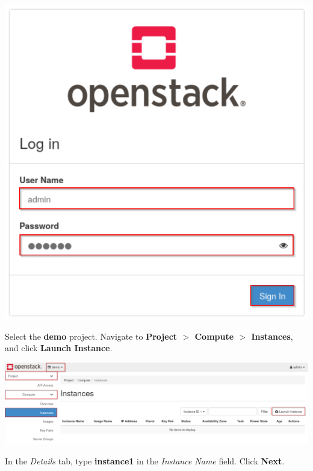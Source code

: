 \documentclass[letterpaper, 12pt]{article}
\begin{document}
\begin{enumerate}
\begin{labstep}
        \begin{center}
            \includegraphics[scale=0.5]{images/part2/step9.png}
        \end{center}
    \end{labstep}

    \begin{labstep}
        Select the \textbf{demo} project.
        Navigate to \textbf{Project $>$ Compute $>$ Instances}, and click \textbf{Launch Instance}.

        \begin{center}
            \includegraphics[width=\linewidth]{images/part2/step10.png}
        \end{center}
    \end{labstep}

    \begin{labstep}
        In the \textit{Details} tab, type \textbf{instance1} in the \textit{Instance Name} field.
        Click \textbf{Next}.


\end{labstep}
\end{enumerate}
\end{document}
